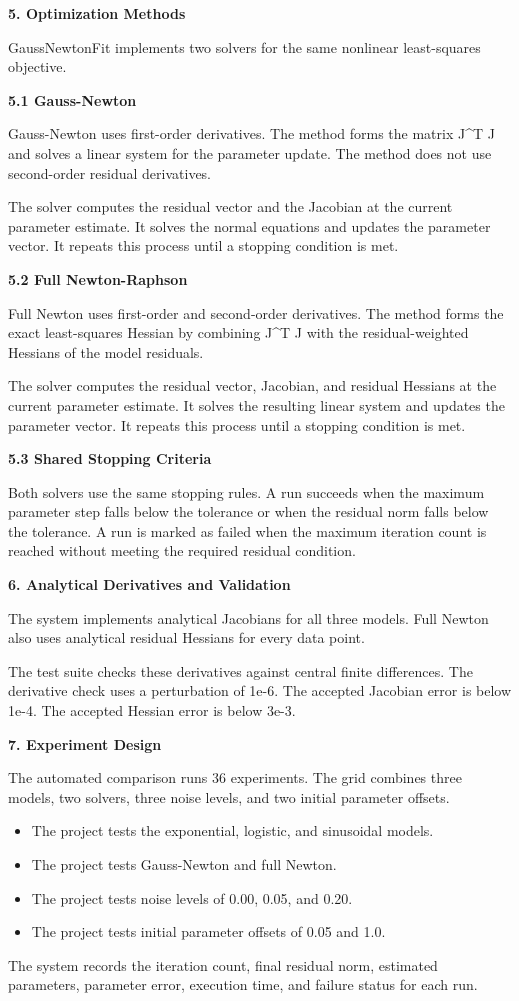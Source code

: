 \documentclass[9pt,a4paper]{extarticle}
\newcommand{\Sec}[1]{\vspace{2pt}\noindent\textbf{#1}\par\vspace{2pt}}
\newcommand{\Sub}[1]{\vspace{2pt}\noindent\textbf{#1}\par\vspace{1pt}}
\begin{document}
\Sec{5. Optimization Methods}
GaussNewtonFit implements two solvers for the same nonlinear least-squares objective.

\Sub{5.1 Gauss-Newton}
Gauss-Newton uses first-order derivatives. The method forms the matrix J\textasciicircum T J and solves a linear system for the parameter update. The method does not use second-order residual derivatives.

The solver computes the residual vector and the Jacobian at the current parameter estimate. It solves the normal equations and updates the parameter vector. It repeats this process until a stopping condition is met.

\Sub{5.2 Full Newton-Raphson}
Full Newton uses first-order and second-order derivatives. The method forms the exact least-squares Hessian by combining J\textasciicircum T J with the residual-weighted Hessians of the model residuals.

The solver computes the residual vector, Jacobian, and residual Hessians at the current parameter estimate. It solves the resulting linear system and updates the parameter vector. It repeats this process until a stopping condition is met.

\Sub{5.3 Shared Stopping Criteria}
Both solvers use the same stopping rules. A run succeeds when the maximum parameter step falls below the tolerance or when the residual norm falls below the tolerance. A run is marked as failed when the maximum iteration count is reached without meeting the required residual condition.

\Sec{6. Analytical Derivatives and Validation}
The system implements analytical Jacobians for all three models. Full Newton also uses analytical residual Hessians for every data point.

The test suite checks these derivatives against central finite differences. The derivative check uses a perturbation of 1e-6. The accepted Jacobian error is below 1e-4. The accepted Hessian error is below 3e-3.
\newpage

\Sec{7. Experiment Design}
The automated comparison runs 36 experiments. The grid combines three models, two solvers, three noise levels, and two initial parameter offsets.
\begin{itemize}
\item The project tests the exponential, logistic, and sinusoidal models.
\item The project tests Gauss-Newton and full Newton.
\item The project tests noise levels of 0.00, 0.05, and 0.20.
\item The project tests initial parameter offsets of 0.05 and 1.0.
\end{itemize}
The system records the iteration count, final residual norm, estimated parameters, parameter error, execution time, and failure status for each run.
\end{document}
